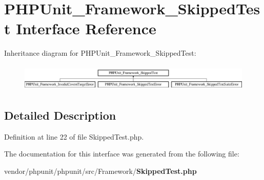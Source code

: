 \section{P\+H\+P\+Unit\+\_\+\+Framework\+\_\+\+Skipped\+Test Interface Reference}
\label{interface_p_h_p_unit___framework___skipped_test}
Inheritance diagram for P\+H\+P\+Unit\+\_\+\+Framework\+\_\+\+Skipped\+Test\+:\begin{figure}[H]
\begin{center}
\leavevmode
\includegraphics[height=1.300813cm]{interface_p_h_p_unit___framework___skipped_test}
\end{center}
\end{figure}


\subsection{Detailed Description}


Definition at line 22 of file Skipped\+Test.\+php.



The documentation for this interface was generated from the following file\+:\begin{DoxyCompactItemize}
\item 
vendor/phpunit/phpunit/src/\+Framework/{\bf Skipped\+Test.\+php}\end{DoxyCompactItemize}

